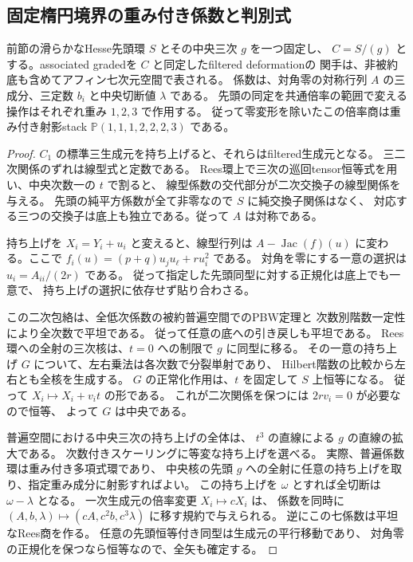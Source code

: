 \subsection{固定楕円境界の重み付き係数と判別式}
\label{subsec:cubic-CY-three-alpha-elliptic-fixed-boundary}

\begin{theorem}\label{thm:cubic-CY-three-alpha-elliptic-fixed-boundary-coefficients}
前節の滑らかなHesse先頭環 $S$ とその中央三次 $g$ を一つ固定し、
$C=S/(g)$ とする。associated gradedを $C$ と同定したfiltered deformationの
関手は、非被約底も含めてアフィン七次元空間で表される。
係数は、対角零の対称行列 $A$ の三成分、三定数 $b_i$ と中央切断値 $\lambda$ である。
先頭の同定を共通倍率の範囲で変える操作はそれぞれ重み $1,2,3$ で作用する。
従って零変形を除いたこの倍率商は重み付き射影stack
$\mathbb P(1,1,1,2,2,2,3)$ である。
\end{theorem}
\begin{proof}
$C_1$ の標準三生成元を持ち上げると、それらはfiltered生成元となる。
三二次関係のずれは線型式と定数である。
Rees環上で三次の巡回tensor恒等式を用い、中央次数一の $t$ で割ると、
線型係数の交代部分が二次交換子の線型関係を与える。
先頭の純平方係数が全て非零なので $S$ に純交換子関係はなく、
対応する三つの交換子は底上も独立である。従って $A$ は対称である。

持ち上げを $X_i=Y_i+u_i$ と変えると、線型行列は
$A-\operatorname{Jac}(f)(u)$ に変わる。ここで
$f_i(u)=(p+q)u_ju_\ell+r u_i^2$ である。
対角を零にする一意の選択は $u_i=A_{ii}/(2r)$ である。
従って指定した先頭同型に対する正規化は底上でも一意で、
持ち上げの選択に依存せず貼り合わさる。

この二次包絡は、全低次係数の被約普遍空間でのPBW定理と
次数別階数一定性により全次数で平坦である。
従って任意の底への引き戻しも平坦である。
Rees環への全射の三次核は、$t=0$ への制限で $g$ に同型に移る。
その一意の持ち上げ $G$ について、左右乗法は各次数で分裂単射であり、
Hilbert階数の比較から左右とも全核を生成する。
$G$ の正常化作用は、$t$ を固定して $S$ 上恒等になる。
従って $X_i\mapsto X_i+v_it$ の形である。
これが二次関係を保つには $2r v_i=0$ が必要なので恒等、
よって $G$ は中央である。

普遍空間における中央三次の持ち上げの全体は、
$t^3$ の直線による $g$ の直線の拡大である。
次数付きスケーリングに等変な持ち上げを選べる。
実際、普遍係数環は重み付き多項式環であり、
中央核の先頭 $g$ への全射に任意の持ち上げを取り、指定重み成分に射影すればよい。
この持ち上げを $\omega$ とすれば全切断は $\omega-\lambda$ となる。
一次生成元の倍率変更 $X_i\mapsto cX_i$ は、
係数を同時に $(A,b,\lambda)\mapsto(cA,c^2b,c^3\lambda)$ に移す規約で与えられる。
逆にこの七係数は平坦なRees商を作る。
任意の先頭恒等付き同型は生成元の平行移動であり、
対角零の正規化を保つなら恒等なので、全矢も確定する。
\end{proof}

